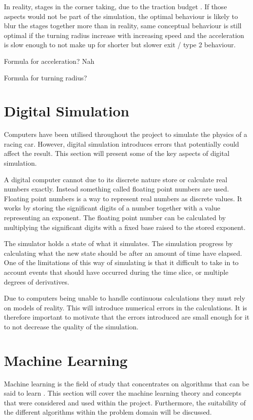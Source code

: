 In reality, stages in the corner taking, due to the traction budget \cite{?}. If those aspects would not be part of the simulation, the optimal behaviour is likely to blur the stages together more than in reality, same conceptual behaviour is still optimal if the turning radius increase with increasing speed and the acceleration is slow enough to not make up for shorter but slower exit / type 2 behaviour.

Formula for acceleration? Nah

Formula for turning radius?


\section{Digital Simulation}


Computers have been utilised throughout the project to simulate the physics of a racing car. However, digital simulation introduces errors that potentially could affect the result. This section will present some of the key aspects of digital simulation. 

A digital computer cannot due to its discrete nature store or calculate real numbers exactly. Instead something called floating point numbers are used. Floating point numbers is a way to represent real numbers as discrete values. It works by storing the significant digits of a number together with a value representing an exponent. The floating point number can be calculated by multiplying the significant digits with a fixed base raised to the stored exponent.

The simulator holds a state of what it simulates. The simulation progress by calculating what the new state should be after an amount of time have elapsed. One of the limitations of this way of simulating is that it difficult to take in to account events that should have occurred during the time slice, or multiple degrees of derivatives. 

Due to computers being unable to handle continuous calculations they must rely on models of reality. This will introduce numerical errors in the calculations. It is therefore important to motivate that the errors introduced are small enough for it to not decrease the quality of the simulation.



\section{Machine Learning}
Machine learning is the field of study that concentrates on algorithms that can be said to learn \cite{glossary}. This section will cover the machine learning theory and concepts that were considered and used within the project. Furthermore, the suitability of the different algorithms within the problem domain will be discussed.  

